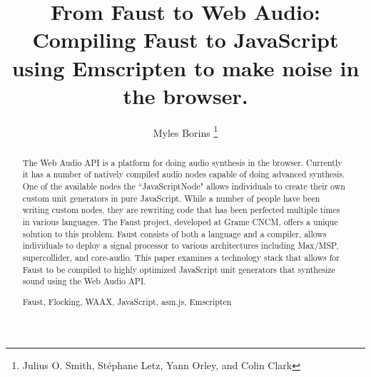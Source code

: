 \documentclass[runningheads,a4paper]{llncs}
\newcommand{\keywords}[1]{\par\addvspace\baselineskip
\noindent\keywordname\enspace\ignorespaces#1}
\begin{document}
\mainmatter  %

\title{From Faust to Web Audio: Compiling Faust to JavaScript using Emscripten to make noise in the browser.}


%
%
\author{Myles Borins \thanks{Julius O. Smith, St\'{e}phane Letz, Yann Orley, and Colin Clark}}
%


%
%


\maketitle


\begin{abstract}
The Web Audio API is a platform for doing audio synthesis in the browser.  Currently it has a number of natively compiled audio nodes capable of doing advanced synthesis.  One of the available nodes the ``JavaScriptNode" allows individuals to create their own custom unit generators in pure JavaScript. While a number of people have been writing custom nodes, they are rewriting code that has been perfected multiple times in various languages. The Faust project, developed at Grame CNCM, offers a unique solution to this problem.  Faust consists of both a language and a compiler, allows individuals to deploy a signal processor to various architectures including Max/MSP, supercollider, and core-audio.  This paper examines a technology stack that allows for Faust to be compiled to highly optimized JavaScript unit generators that synthesize sound using the Web Audio API.  


\keywords{Faust, Flocking, WAAX, JavaScript, asm.js, Emscripten}
\end{abstract}
\end{document}
